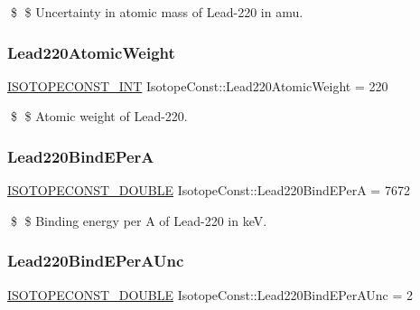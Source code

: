\$ \$ Uncertainty in atomic mass of Lead-\/220 in amu. \mbox{\label{group___isotope_const-_lead-_pb220_ga8ca47f87e83d5139afb126f253a26346}} 
\subsubsection{\texorpdfstring{Lead220\+Atomic\+Weight}{Lead220AtomicWeight}}
{\footnotesize\ttfamily \mbox{\hyperlink{group___isotope_const-_macros_ga5f18360b3e99483a35c32d789e62621c}{I\+S\+O\+T\+O\+P\+E\+C\+O\+N\+S\+T\+\_\+\+I\+NT}} Isotope\+Const\+::\+Lead220\+Atomic\+Weight = 220}

\$ \$ Atomic weight of Lead-\/220. \mbox{\label{group___isotope_const-_lead-_pb220_gafe3bbb2109dd1358b146306f2018d6b9}} 
\subsubsection{\texorpdfstring{Lead220\+Bind\+E\+PerA}{Lead220BindEPerA}}
{\footnotesize\ttfamily \mbox{\hyperlink{group___isotope_const-_macros_ga8f45a7272ce02c0b4c65c44636ed719a}{I\+S\+O\+T\+O\+P\+E\+C\+O\+N\+S\+T\+\_\+\+D\+O\+U\+B\+LE}} Isotope\+Const\+::\+Lead220\+Bind\+E\+PerA = 7672}

\$ \$ Binding energy per A of Lead-\/220 in keV. \mbox{\label{group___isotope_const-_lead-_pb220_ga2c2cce03a5e3f971791f28088dd6b78a}} 
\subsubsection{\texorpdfstring{Lead220\+Bind\+E\+Per\+A\+Unc}{Lead220BindEPerAUnc}}
{\footnotesize\ttfamily \mbox{\hyperlink{group___isotope_const-_macros_ga8f45a7272ce02c0b4c65c44636ed719a}{I\+S\+O\+T\+O\+P\+E\+C\+O\+N\+S\+T\+\_\+\+D\+O\+U\+B\+LE}} Isotope\+Const\+::\+Lead220\+Bind\+E\+Per\+A\+Unc = 2}

